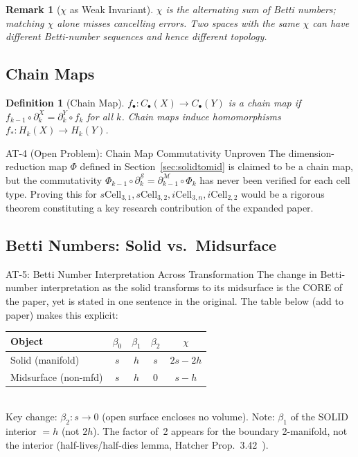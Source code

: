 \documentclass[journal,twocolumn,10pt]{IEEEtran}
\newtheorem{definition}[theorem]{Definition}
\newtheorem{remark}[theorem]{Remark}
\newcommand{\Hk}[1]{H_{#1}}
\newcommand{\Betti}[1]{\beta_{#1}}
\newcommand{\Euler}{\chi}
\newcommand{\bdry}{\partial}
\newcommand{\sCell}[2]{s\text{Cell}_{#1,#2}}
\newcommand{\iCell}[2]{i\text{Cell}_{#1,#2}}
\begin{document}
\begin{remark}[$\Euler$ as Weak Invariant]
$\Euler$ is the alternating sum of Betti numbers; matching $\Euler$ alone
misses cancelling errors. Two spaces with the same $\Euler$ can have
different Betti-number sequences and hence different topology.
\end{remark}

\subsection{Chain Maps}

\begin{definition}[Chain Map]
$f_\bullet:C_\bullet(X)\to C_\bullet(Y)$ is a \emph{chain map} if
$f_{k-1}\circ\bdry_k^X=\bdry_k^Y\circ f_k$ for all $k$.
Chain maps induce homomorphisms $f_*:\Hk{k}(X)\to\Hk{k}(Y)$.
\end{definition}

\begin{atblock}{AT-4 (Open Problem): Chain Map Commutativity Unproven}
The dimension-reduction map $\Phi$ defined in Section~\ref{sec:solidtomid}
is claimed to be a chain map, but the commutativity
$\Phi_{k-1}\circ\bdry_k^{\mathcal{S}}=\bdry_{k-1}^{\mathcal{M}}\circ\Phi_k$
has never been verified for each cell type. Proving this for
$\sCell{3}{1},\sCell{3}{2},\iCell{3}{n},\iCell{2}{2}$ would be a rigorous
theorem constituting a key research contribution of the expanded paper.
\end{atblock}

\subsection{Betti Numbers: Solid vs.\ Midsurface}\label{sec:betti_interp}

\begin{atblock}{AT-5: Betti Number Interpretation Across Transformation}
The change in Betti-number interpretation as the solid transforms to its
midsurface is the CORE of the paper, yet is stated in one sentence in the
original. The table below (add to paper) makes this explicit:\smallskip\\
\begin{tabular}{@{}lcccc@{}}
\toprule
Object & $\Betti{0}$ & $\Betti{1}$ & $\Betti{2}$ & $\Euler$ \\
\midrule
Solid (manifold)     & $s$ & $h$ & $s$ & $2s{-}2h$ \\
Midsurface (non-mfd) & $s$ & $h$ & $0$ & $s{-}h$ \\
\bottomrule
\end{tabular}\smallskip\\
Key change: $\Betti{2}:s\to0$ (open surface encloses no volume).
Note: $\Betti{1}$ of the SOLID interior $=h$ (not $2h$). The factor of~2
appears for the boundary 2-manifold, not the interior
(half-lives/half-dies lemma, Hatcher Prop.~3.42~\cite{Hatcher2002}).
\end{atblock}
\end{document}
